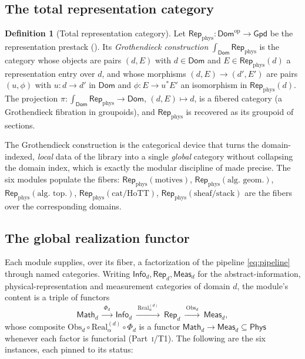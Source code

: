 \documentclass[12pt]{article}
\theoremstyle{definition}
\newtheorem{definition}[theorem]{Definition}
\theoremstyle{remark}
\newcommand{\Dom}{\mathsf{Dom}}
\newcommand{\Math}{\mathsf{Math}}
\newcommand{\Phys}{\mathsf{Phys}}
\newcommand{\Info}{\mathsf{Info}}
\newcommand{\Rep}{\mathsf{Rep}}
\newcommand{\Meas}{\mathsf{Meas}}
\newcommand{\Gpd}{\mathsf{Gpd}}
\newcommand{\Real}{\mathrm{Real}}
\newcommand{\Obs}{\mathrm{Obs}}
\newcommand{\Repphys}{\mathsf{Rep}_{\mathrm{phys}}}
\newcommand{\op}{\mathrm{op}}
\newcommand{\PI}{\textsc{i}}
\begin{document}
\subsection{The total representation category}

\begin{definition}[Total representation category]
\label{def:total}
Let $\Repphys:\Dom^\op\to\Gpd$ be the representation prestack ().
Its \emph{Grothendieck construction} $\int_\Dom\Repphys$ is the category whose objects
are pairs $(d,E)$ with $d\in\Dom$ and $E\in\Repphys(d)$ a representation entry over
$d$, and whose morphisms $(d,E)\to(d',E')$ are pairs $(u,\phi)$ with $u:d\to d'$ in
$\Dom$ and $\phi:E\to u^*E'$ an isomorphism in $\Repphys(d)$.  The projection
$\pi:\int_\Dom\Repphys\to\Dom$, $(d,E)\mapsto d$, is a fibered category (a
Grothendieck fibration in groupoids), and $\Repphys$ is recovered as its groupoid of
sections.
\end{definition}

The Grothendieck construction is the categorical device that turns the domain-indexed,
\emph{local} data of the library into a single \emph{global} category without
collapsing the domain index, which is exactly the modular discipline of 
made precise.  The six modules populate the fibers:
$\Repphys(\text{motives})$, $\Repphys(\text{alg.\ geom.})$,
$\Repphys(\text{alg.\ top.})$, $\Repphys(\text{cat/HoTT})$,
$\Repphys(\text{sheaf/stack})$ are the fibers over the corresponding domains.

\subsection{The global realization functor}

Each module supplies, over its fiber, a factorization of the pipeline
\eqref{eq:pipeline} through named categories.  Writing $\Info_d,\Rep_d,\Meas_d$ for
the abstract-information, physical-representation and measurement categories of domain
$d$, the module's content is a triple of functors
\[
\Math_d\ \xrightarrow{\ \Phi_d\ }\ \Info_d\
\xrightarrow{\ \Real^{(d)}_\alpha\ }\ \Rep_d\
\xrightarrow{\ \Obs_d\ }\ \Meas_d,
\]
whose composite $\Obs_d\circ\Real^{(d)}_\alpha\circ\Phi_d$ is a functor
$\Math_d\to\Meas_d\subseteq\Phys$ whenever each factor is functorial (Part~\PI/T1).
The following are the six instances, each pinned to its status:
\end{document}
